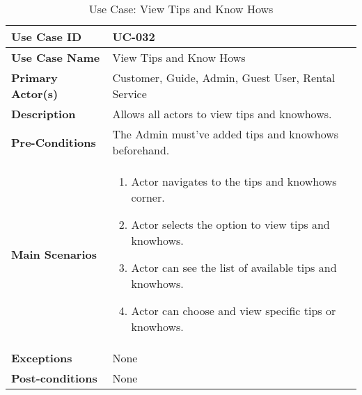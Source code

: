 \begin{table}[ht]
    \centering
    \begin{tabular}{|l|p{}|}
        \hline
        \textbf{Use Case ID} & UC-032 \\
        \hline
        \textbf{Use Case Name} & View Tips and Know Hows \\
        \hline
        \textbf{Primary Actor(s)} & Customer, Guide, Admin, Guest User, Rental Service \\
        \hline
        \textbf{Description} & Allows all actors to view tips and knowhows. \\
        \hline
        \textbf{Pre-Conditions} & The Admin must've added tips and knowhows beforehand. \\
        \hline
        \textbf{Main Scenarios} & 
        \begin{enumerate}[label=\arabic*.,itemsep=0pt]
            \item Actor navigates to the tips and knowhows corner.
            \item Actor selects the option to view tips and knowhows.
            \item Actor can see the list of available tips and knowhows.
            \item Actor can choose and view specific tips or knowhows.
        \end{enumerate} \\
        \hline
        \textbf{Exceptions} & None \\
        \hline
        \textbf{Post-conditions} & None \\
        \hline
    \end{tabular}
    \label{tab:use-case-view-tips-know-hows}
    \caption{Use Case: View Tips and Know Hows}
\end{table}

